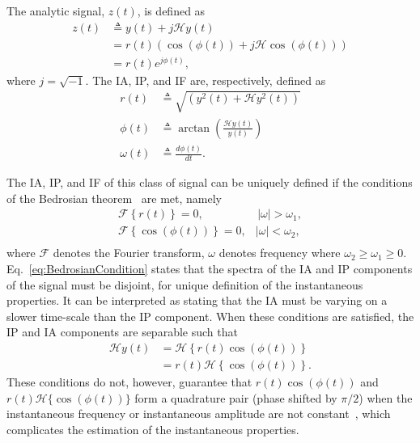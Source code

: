 \documentclass[11pt,draftcls,onecolumn]{IEEEtran}
\begin{document}
The analytic signal, $z(t)$, is defined as
\begin{align}\label{eq:AnalyticSignal}
	z\left( t \right) &\triangleq y\left( t \right) + j\mathcal{H}y\left( t \right) \\
    &= r\left( t \right)\left(\cos\left(\phi\left(t\right)\right) + j \mathcal{H}\cos\left(\phi\left(t\right)\right)\right) \\
&= r\left( t \right){e^{j\phi \left( t \right)}},
\end{align}
where $j=\sqrt{-1}$. The IA, IP, and IF are, respectively, defined as
\begin{align}
	r(t) &\triangleq \sqrt{\left(y^2(t) + \mathcal{H}y^2(t)\right)}\label{eq:IAdef}\\
	\phi(t) &\triangleq \arctan\left(\frac{\mathcal{H}y\left( t \right)}{y\left(t\right)}\right) \label{eq:IPdef}\\
\omega \left( t \right) &\triangleq \frac{d\phi \left( t \right)}{dt}. \label{eq:IFdef}
\end{align}

The IA, IP, and IF of this class of signal can be uniquely defined if the conditions of the Bedrosian theorem~\cite{Bedrosian1963} are met, namely
\begin{equation}\label{eq:BedrosianCondition}
\begin{array}{*{20}{c}}
   {\mathcal{F}\left\{ {r\left( t \right)} \right\} = 0,} & {\,\left| \omega \right| > \omega_1,}  \\
   {\mathcal{F}\left\{ {\cos\left(\phi \left( t \right)\right)} \right\} = 0,} & {\left| \omega \right| < \omega_2,}  \\
\end{array}
\end{equation}
where $\mathcal{F}$ denotes the Fourier transform, $\omega$ denotes frequency where $\omega_2 \ge \omega_1 \ge 0$. Eq.~\ref{eq:BedrosianCondition} states that the spectra of the IA and IP components of the signal must be disjoint, for unique definition of the instantaneous properties. It can be interpreted as stating that the IA must be varying on a slower time-scale than the IP component. When these conditions are satisfied, the IP and IA components are separable such that
\begin{align}\label{eq:SepAmpandPhase}
   \mathcal{H}y\left( t \right) &= \mathcal{H}\left\{ {r\left( t \right)\cos \left( {\phi \left( t \right)} \right)} \right\} \nonumber \\
   &= r\left( t \right)\mathcal{H}\left\{ {\cos \left( {\phi \left( t \right)} \right)} \right\}.
\end{align}
These conditions do not, however, guarantee that $r\left(t\right)\cos(\phi(t))$ and $r\left(t\right)\mathcal{H}\{\cos(\phi(t))\}$ form a quadrature pair (phase shifted by $\pi/2$) when the instantaneous frequency or instantaneous amplitude are not constant~\cite{Nuttall1966}, which complicates the estimation of the instantaneous properties. 
\end{document}
